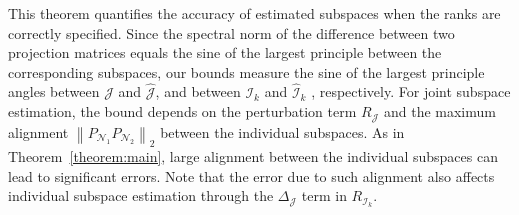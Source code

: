 \documentclass{amsart}
\newcommand{\Ncal}{\mathcal{N}}
\newcommand{\Jcal}{\mathcal{J}}
\newcommand{\Ical}{\mathcal{I}}
\begin{document}
This theorem quantifies the accuracy of estimated subspaces when the ranks are correctly specified. Since the spectral norm of the difference between two projection matrices equals the sine of the largest principle between the corresponding subspaces, our bounds measure the sine of the largest principle angles between  $\Jcal$ and $\widehat{\Jcal}$, and between ${\Ical}_k$ and $\widehat{\Ical}_k$ , respectively. For joint subspace estimation, the bound depends on the perturbation term $R_{\Jcal}$ and the maximum alignment $\left\|P_{\Ncal_1} P_{\Ncal_2}\right\|_2$ between the individual subspaces. {As in Theorem~\ref{theorem:main}, large alignment between the individual subspaces can lead to significant errors. Note that the error due to such alignment also affects individual subspace estimation through the $\Delta_{\Jcal}$ term in $R_{\Ical_k}$.} 
\end{document}
